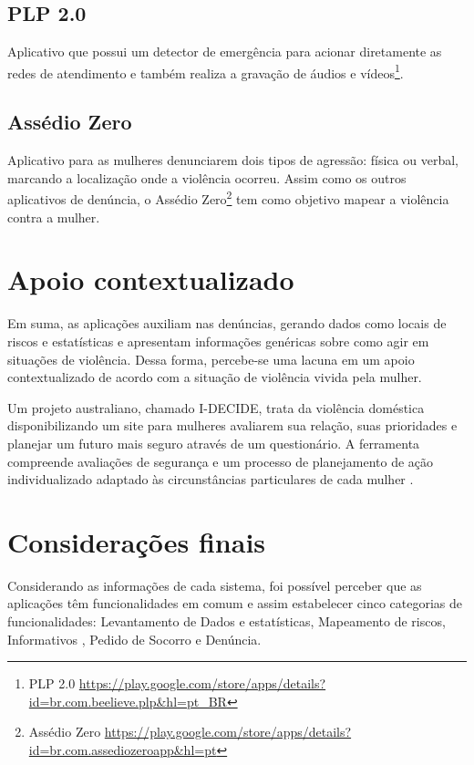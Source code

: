 \subsection*{PLP 2.0}
Aplicativo que possui um detector de emergência para acionar diretamente as redes de atendimento 
e também realiza a gravação de áudios e vídeos\footnote{PLP 2.0 \url{https://play.google.com/store/apps/details?id=br.com.beelieve.plp&hl=pt_BR}}.

\subsection*{Assédio Zero}

Aplicativo para as mulheres denunciarem dois tipos de agressão: física ou verbal, marcando a localização 
onde a violência ocorreu. Assim como os outros aplicativos de denúncia, o Assédio Zero\footnote{Assédio Zero \url{https://play.google.com/store/apps/details?id=br.com.assediozeroapp&hl=pt}} tem como objetivo mapear a violência contra a mulher.

\section{Apoio contextualizado}

Em suma, as aplicações auxiliam nas denúncias, gerando dados como locais de riscos e estatísticas e
apresentam informações genéricas sobre como agir em situações de violência. Dessa forma, percebe-se uma lacuna em um apoio contextualizado de acordo com a situação de violência vivida pela mulher.

Um projeto australiano, chamado I-DECIDE, trata da violência doméstica disponibilizando um site para mulheres avaliarem sua relação, suas prioridades e planejar um futuro mais seguro através de um questionário. A ferramenta compreende avaliações de segurança e um processo de planejamento de ação individualizado adaptado às circunstâncias particulares de cada mulher \cite{idecide}.

\section{Considerações finais}

Considerando as informações de cada sistema, foi possível perceber que as aplicações têm funcionalidades
em comum e assim estabelecer cinco categorias de funcionalidades: Levantamento de Dados e estatísticas, Mapeamento de riscos, Informativos , Pedido de Socorro e Denúncia. 

